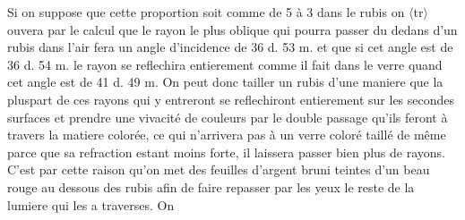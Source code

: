 Si on suppose que cette proportion soit comme de 5 \`{a} 3 dans le rubis on $\langle$tr$\rangle$ ouvera par le calcul que le rayon le plus oblique qui pourra passer du dedans d'un rubis dans l'air fera un angle d'incidence\protect{}  de 36 d. 53 m. et que si cet angle est de 36 d. 54 m. le rayon se reflechira entierement comme il fait dans le verre quand cet angle est de 41 d. 49 m. On peut donc tailler un rubis d'une maniere que la pluspart de ces rayons qui y entreront se reflechiront entierement sur les secondes surfaces et prendre une vivacit\'{e} de couleurs par le double passage qu'ils feront \`{a} travers la matiere color\'{e}e, ce qui n'arrivera pas \`{a} un verre color\'{e} taill\'{e} de même parce que sa refraction\protect{} estant moins forte, il laissera passer bien plus de rayons. C'est par cette raison qu'on met des feuilles d'argent bruni teintes d'un beau rouge au dessous des rubis afin de faire repasser par les yeux le reste de la lumiere qui les a traverses. On